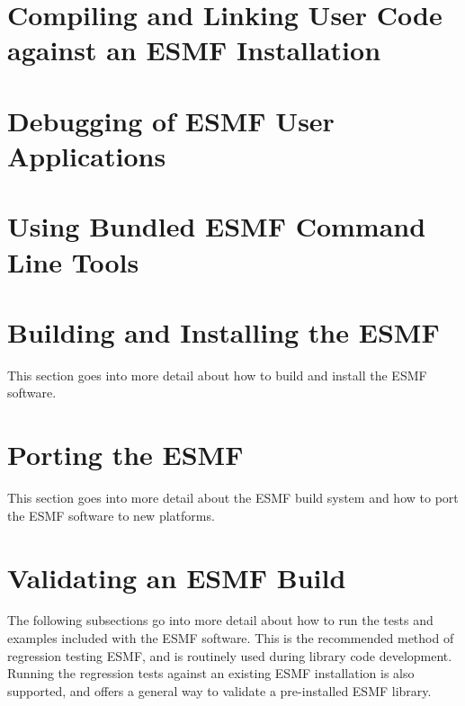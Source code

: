 
\section{Compiling and Linking User Code against an ESMF Installation}
\label{sec:Use}


\newpage

\section{Debugging of ESMF User Applications}
\label{sec:Debug}


\newpage

\section{Using Bundled ESMF Command Line Tools}
\label{sec:CLTs}


\newpage

\section{Building and Installing the ESMF}
\label{sec:TechOver}

This section goes into more detail about how to build and install the ESMF
software.




\section{Porting the ESMF}
\label{sec:TechOverPort}

This section goes into more detail about the ESMF build system and how to
port the ESMF software to new platforms.




\section{Validating an ESMF Build}
\label{sec:TechOver2}

The following subsections go into more detail about how to run the tests and
examples included with the ESMF software. This is the recommended method of
regression testing ESMF, and is routinely used during library code development.
Running the regression tests against an existing ESMF installation is also 
supported, and offers a general way to validate a pre-installed ESMF library.





